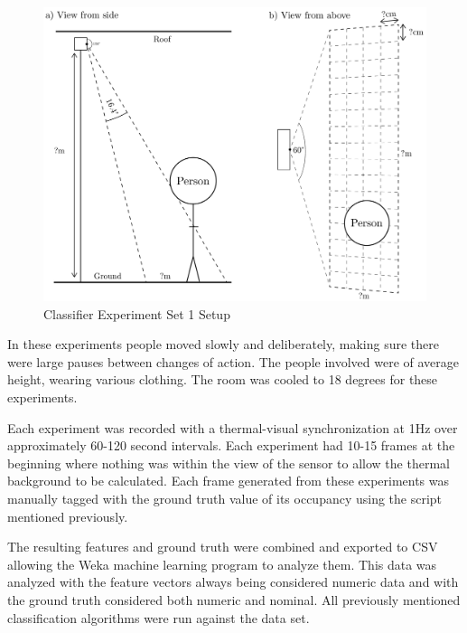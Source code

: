 \documentclass[../thesis/thesis.tex]{subfiles}
\begin{document}
\begin{landscape}
 \begin{figure}
 \centering
 \includegraphics[height=\textheight]{../diagrams/third-exp-setup2.pdf}
 \caption{Classifier Experiment Set 1 Setup}
 \label{fig:exps:3setup}
 \end{figure}
\end{landscape}

In these experiments people moved slowly and deliberately, making sure there were large pauses between changes of action. The people involved were of average height, wearing various clothing. The room was cooled to 18 degrees for these experiments.

Each experiment was recorded with a thermal-visual synchronization at 1Hz over approximately 60-120 second intervals. Each experiment had 10-15 frames at the beginning where nothing was within the view of the sensor to allow the thermal background to be calculated. Each frame generated from these experiments was manually tagged with the ground truth value of its occupancy using the script mentioned previously.

The resulting features and ground truth were combined and exported to CSV allowing the Weka machine learning program to analyze them. This data was analyzed with the feature vectors always being considered numeric data and with the ground truth considered both numeric and nominal. All previously mentioned classification algorithms were run against the data set.

\end{document}
